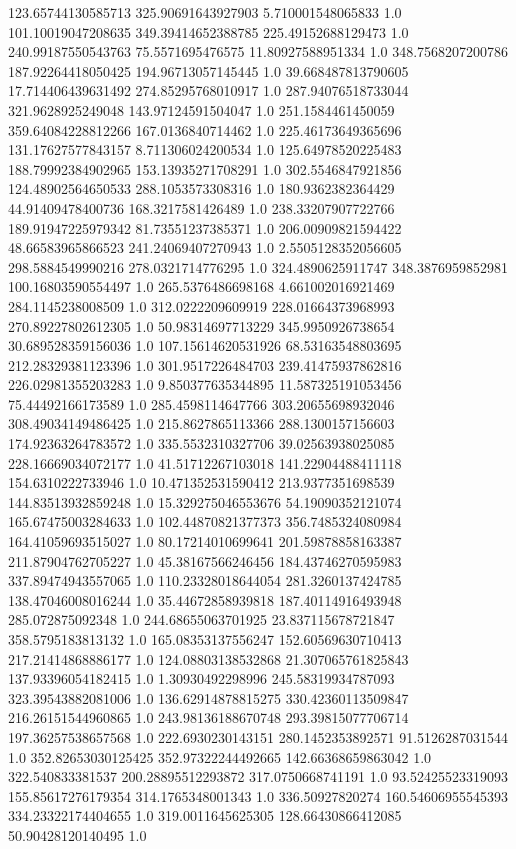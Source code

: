 123.65744130585713	325.90691643927903	5.710001548065833	1.0
101.10019047208635	349.39414652388785	225.49152688129473	1.0
240.99187550543763	75.5571695476575	11.80927588951334	1.0
348.7568207200786	187.92264418050425	194.96713057145445	1.0
39.668487813790605	17.714406439631492	274.85295768010917	1.0
287.94076518733044	321.9628925249048	143.97124591504047	1.0
251.1584461450059	359.64084228812266	167.0136840714462	1.0
225.46173649365696	131.17627577843157	8.711306024200534	1.0
125.64978520225483	188.79992384902965	153.13935271708291	1.0
302.5546847921856	124.48902564650533	288.1053573308316	1.0
180.9362382364429	44.91409478400736	168.3217581426489	1.0
238.33207907722766	189.91947225979342	81.73551237385371	1.0
206.00909821594422	48.66583965866523	241.24069407270943	1.0
2.5505128352056605	298.5884549990216	278.0321714776295	1.0
324.4890625911747	348.3876959852981	100.16803590554497	1.0
265.5376486698168	4.661002016921469	284.1145238008509	1.0
312.0222209609919	228.01664373968993	270.89227802612305	1.0
50.98314697713229	345.9950926738654	30.689528359156036	1.0
107.15614620531926	68.53163548803695	212.28329381123396	1.0
301.9517226484703	239.41475937862816	226.02981355203283	1.0
9.850377635344895	11.587325191053456	75.44492166173589	1.0
285.4598114647766	303.20655698932046	308.49034149486425	1.0
215.8627865113366	288.1300157156603	174.92363264783572	1.0
335.5532310327706	39.02563938025085	228.16669034072177	1.0
41.51712267103018	141.22904488411118	154.6310222733946	1.0
10.471352531590412	213.9377351698539	144.83513932859248	1.0
15.329275046553676	54.19090352121074	165.67475003284633	1.0
102.44870821377373	356.7485324080984	164.41059693515027	1.0
80.17214010699641	201.59878858163387	211.87904762705227	1.0
45.38167566246456	184.43746270595983	337.89474943557065	1.0
110.23328018644054	281.3260137424785	138.47046008016244	1.0
35.44672858939818	187.40114916493948	285.072875092348	1.0
244.68655063701925	23.837115678721847	358.5795183813132	1.0
165.08353137556247	152.60569630710413	217.21414868886177	1.0
124.08803138532868	21.307065761825843	137.93396054182415	1.0
1.30930492298996	245.58319934787093	323.39543882081006	1.0
136.62914878815275	330.42360113509847	216.26151544960865	1.0
243.98136188670748	293.39815077706714	197.36257538657568	1.0
222.6930230143151	280.1452353892571	91.5126287031544	1.0
352.82653030125425	352.97322244492665	142.66368659863042	1.0
322.540833381537	200.28895512293872	317.0750668741191	1.0
93.52425523319093	155.85617276179354	314.1765348001343	1.0
336.50927820274	160.54606955545393	334.23322174404655	1.0
319.0011645625305	128.66430866412085	50.90428120140495	1.0
